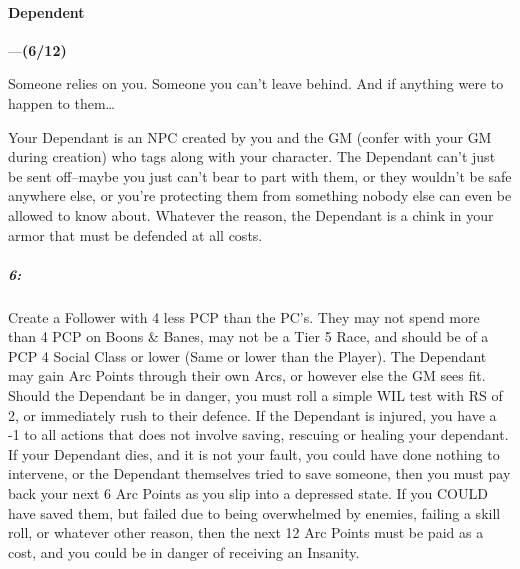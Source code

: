 \documentclass[oneside,11pt,english]{book}
\begin{document}
\paragraph{\label{bane:Dependent}Dependent}---\quad\textbf{(6/12) }\par
Someone relies on you. Someone you can’t leave behind. And if anything were to happen to them…


Your Dependant is an NPC created by you and the GM (confer with your GM during creation) who tags 
along with your character. The Dependant can’t just be sent off--maybe you just can’t bear to part with 
them, or they wouldn’t be safe anywhere else, or you’re protecting them from something nobody else can 
even be allowed to know about. Whatever the reason, the Dependant is a chink in your armor that must be 
defended at all costs. 
\subparagraph{6:} Create a Follower with 4 less PCP than the PC’s. They may not spend more than 4 PCP on Boons \& Banes, may not be a Tier 5 Race, and should be of a PCP 4 Social Class or lower (Same or lower than the Player). The Dependant may gain Arc Points through their own Arcs, or however else the GM sees fit. Should the Dependant be in danger, you must roll a simple WIL test with RS of 2, or immediately rush to their defence. If the Dependant is injured, you have a -1 to all actions that does not involve saving, rescuing or healing your dependant. If your Dependant dies, and it is not your fault, you could have done nothing to intervene, or the Dependant themselves tried to save someone, then you must pay back your next 6 Arc Points as you slip into a depressed state. If you COULD have saved them, but failed due to being overwhelmed by enemies, failing a skill roll, or whatever other reason, then the next 12 Arc Points must be paid as a cost, and you could be in danger of receiving an Insanity.\par
\end{document}
